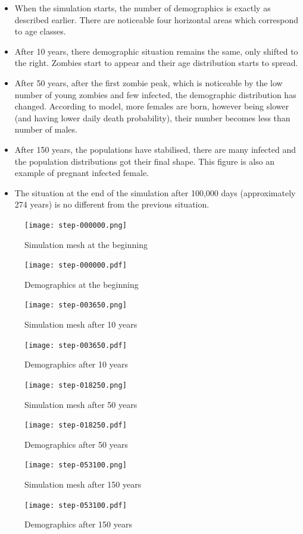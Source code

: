 \documentclass[a4paper]{article}
\begin{document}
\begin{itemize}
\item When the simulation starts, the number of demographics is exactly as described earlier.
    There are noticeable four horizontal areas which correspond to age classes.
\item After 10 years, there demographic situation remains the same, only shifted to the right.
    Zombies start to appear and their age distribution starts to spread.
\item After 50 years, after the first zombie peak, which is noticeable by the low number of young zombies and few infected, the demographic distribution has changed.
    According to model, more females are born, however being slower (and having lower daily death probability), their number becomes less than number of males.
\item After 150 years, the populations have stabilised, there are many infected and the population distributions got their final shape.
    This figure is also an example of pregnant infected female.
\item The situation at the end of the simulation after 100,000 days (approximately 274 years) is no different from the previous situation.
\end{itemize}

\begin{figure}[pht]
    \centering
    \texttt{[image: step-000000.png]}
    \caption{Simulation mesh at the beginning}
    \texttt{[image: step-000000.pdf]}
    \caption{Demographics at the beginning}
\end{figure}

\begin{figure}[pht]
    \centering
    \texttt{[image: step-003650.png]}
    \caption{Simulation mesh after 10 years}
    \texttt{[image: step-003650.pdf]}
    \caption{Demographics after 10 years}
\end{figure}

\begin{figure}[pht]
    \centering
    \texttt{[image: step-018250.png]}
    \caption{Simulation mesh after 50 years}
    \texttt{[image: step-018250.pdf]}
    \caption{Demographics after 50 years}
\end{figure}

\begin{figure}[pht]
    \centering
    \texttt{[image: step-053100.png]}
    \caption{Simulation mesh after 150 years}
    \texttt{[image: step-053100.pdf]}
    \caption{Demographics after 150 years}
\end{figure}
\end{document}
